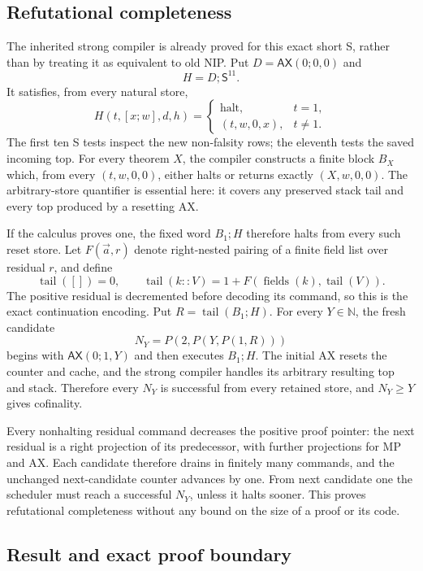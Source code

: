 \subsection{Refutational completeness}

The inherited strong compiler is already proved for this exact short
S, rather than by treating it as equivalent to old NIP.  Put
$D=\mathsf{AX}(0;0,0)$ and
\[
                    H=D;\mathsf S^{11}.
\]
It satisfies, from every natural store,
\[
 H(t,[x;w],d,h)=
 \begin{cases}
   \text{halt},&t=1,\\
   (t,w,0,x),&t\ne1.
 \end{cases}
\]
The first ten S tests inspect the new non-falsity rows; the eleventh
tests the saved incoming top.  For every theorem $X$, the compiler
constructs a finite block $B_X$ which, from every $(t,w,0,0)$, either
halts or returns exactly $(X,w,0,0)$.  The arbitrary-store quantifier
is essential here: it covers any preserved stack tail and every top
produced by a resetting AX.

If the calculus proves one, the fixed word $B_1;H$ therefore halts
from every such reset store.  Let $F(\vec a,r)$ denote right-nested
pairing of a finite field list over residual $r$, and define
\[
 \operatorname{tail}([])=0,\qquad
 \operatorname{tail}(k::V)=1+
       F(\operatorname{fields}(k),\operatorname{tail}(V)).
\]
The positive residual is decremented before decoding its command, so
this is the exact continuation encoding.  Put
$R=\operatorname{tail}(B_1;H)$.  For every $Y\in\mathbb N$, the fresh
candidate
\[
                  N_Y=P(2,P(Y,P(1,R)))
\]
begins with $\mathsf{AX}(0;1,Y)$ and then executes $B_1;H$.
The initial AX resets the counter and cache, and the strong compiler
handles its arbitrary resulting top and stack.  Therefore every $N_Y$
is successful from every retained store, and $N_Y\ge Y$ gives cofinality.

Every nonhalting residual command decreases the positive proof pointer:
the next residual is a right projection of its predecessor, with further
projections for MP and AX.  Each candidate therefore drains in finitely
many commands, and the unchanged next-candidate counter advances by
one.  From next candidate one the scheduler must reach a successful
$N_Y$, unless it halts sooner.  This proves refutational completeness
without any bound on the size of a proof or its code.

\subsection{Result and exact proof boundary}

